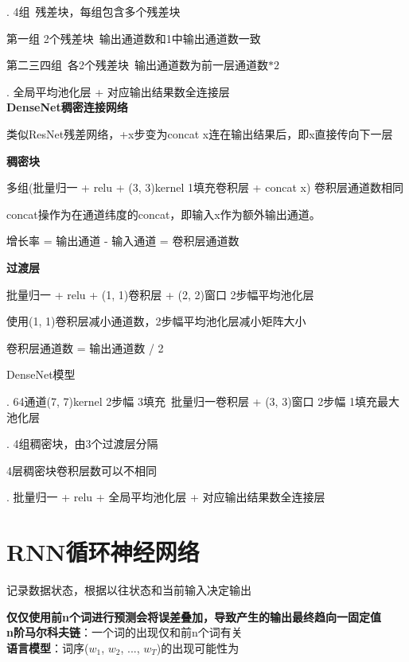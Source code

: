 \documentclass[UTF8]{ctexart}
\begin{document}
  . 4组\ 残差块，每组包含多个残差块

  \quad \quad 第一组 2个残差块\ 输出通道数和1中输出通道数一致
  
  \quad \quad 第二三四组\ 各2个残差块\ 输出通道数为前一层通道数$*2$

  . 全局平均池化层 + 对应输出结果数全连接层\\
\textbf{DenseNet稠密连接网络}

  类似ResNet残差网络，+x步变为concat x连在输出结果后，即x直接传向下一层

  \textbf{稠密块}

  \quad 多组(批量归一 + relu + (3, 3)kernel 1填充卷积层 + concat x) 卷积层通道数相同

  \quad concat操作为在通道纬度的concat，即输入x作为额外输出通道。

  \quad 增长率 = 输出通道 - 输入通道 = 卷积层通道数

  \textbf{过渡层}

  \quad 批量归一 + relu + (1, 1)卷积层 + (2, 2)窗口 2步幅平均池化层
  
  \quad 使用(1, 1)卷积层减小通道数，2步幅平均池化层减小矩阵大小

  \quad \quad 卷积层通道数 = 输出通道数 / 2

  DenseNet模型

  . 64通道(7, 7)kernel 2步幅 3填充\ 批量归一卷积层 + (3, 3)窗口 2步幅 1填充最大池化层

  . 4组稠密块，由3个过渡层分隔

  \quad \quad 4层稠密块卷积层数可以不相同

  . 批量归一 + relu + 全局平均池化层 + 对应输出结果数全连接层

\section{RNN循环神经网络}

\noindent 记录数据状态，根据以往状态和当前输入决定输出

  \textbf{仅仅使用前n个词进行预测会将误差叠加，导致产生的输出最终趋向一固定值}\\
\textbf{n阶马尔科夫链}：一个词的出现仅和前n个词有关\\
\textbf{语言模型}：词序($w_1$, $w_2$, ..., $w_T$)的出现可能性为
\end{document}
